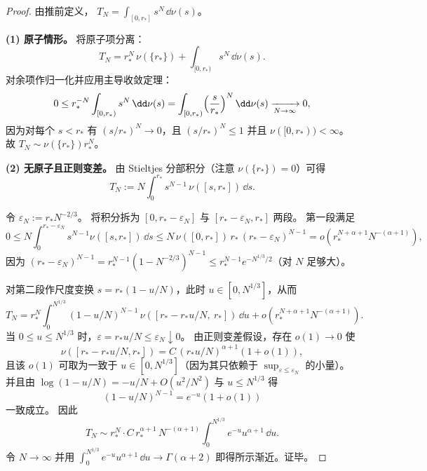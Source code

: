 \begin{proof}
由推前定义，
\(
T_N=\int_{[0,r_\ast]} s^N\,\dd\nu(s)
\)。

\textbf{(1) 原子情形。}
将原子项分离：
\[
T_N=r_\ast^N\,\nu(\{r_\ast\})+\int_{[0,r_\ast)} s^{N}\,\dd\nu(s).
\]
对余项作归一化并应用主导收敛定理：
\[
0\le r_\ast^{-N}\int_{[0,r_\ast)} s^{N}\,\dd\nu(s)
=\int_{[0,r_\ast)}\Bigl(\frac{s}{r_\ast}\Bigr)^{N}\,\dd\nu(s)\xrightarrow[N\to\infty]{}0,
\]
因为对每个 \(s<r_\ast\) 有 \((s/r_\ast)^N\to 0\)，且 \((s/r_\ast)^N\le 1\) 并且 \(\nu([0,r_\ast))<\infty\)。
故 \(T_N\sim \nu(\{r_\ast\})r_\ast^N\)。

\textbf{(2) 无原子且正则变差。}
由 Stieltjes 分部积分（注意 \(\nu(\{r_\ast\})=0\)）可得
\[
T_N
:=N\int_{0}^{r_\ast} s^{N-1}\,\nu([s,r_\ast])\,\dd s.
\]
\par
令 \(\varepsilon_N:=r_\ast N^{-2/3}\)。
将积分拆为 \([0,r_\ast-\varepsilon_N]\) 与 \([r_\ast-\varepsilon_N,r_\ast]\) 两段。
第一段满足
\[
0\le N\int_{0}^{r_\ast-\varepsilon_N} s^{N-1}\nu([s,r_\ast])\,\dd s
\le N\,\nu([0,r_\ast])\,r_\ast\,(r_\ast-\varepsilon_N)^{N-1}
=o\!\left(r_\ast^{N+\alpha+1}N^{-(\alpha+1)}\right),
\]
因为 \((r_\ast-\varepsilon_N)^{N-1}=r_\ast^{N-1}(1-N^{-2/3})^{N-1}\le r_\ast^{N-1}e^{-N^{1/3}/2}\)（对 \(N\) 足够大）。
\par
对第二段作尺度变换 \(s=r_\ast(1-u/N)\)，此时 \(u\in[0,N^{1/3}]\)，从而
\[
T_N
=r_\ast^{N}\int_{0}^{N^{1/3}}(1-u/N)^{N-1}\,
\nu\!\left([r_\ast-r_\ast u/N,\ r_\ast]\right)\,\dd u
+o\!\left(r_\ast^{N+\alpha+1}N^{-(\alpha+1)}\right).
\]
当 \(0\le u\le N^{1/3}\) 时，\(\varepsilon=r_\ast u/N\le \varepsilon_N\downarrow 0\)。
由正则变差假设，存在 \(o(1)\to 0\) 使
\[
\nu([r_\ast-r_\ast u/N,r_\ast])=C\,(r_\ast u/N)^{\alpha+1}(1+o(1)),
\]
且该 \(o(1)\) 可取为一致于 \(u\in[0,N^{1/3}]\)（因为其只依赖于 \(\sup_{\varepsilon\le \varepsilon_N}\) 的小量）。
并且由 \(\log(1-u/N)=-u/N+O(u^2/N^2)\) 与 \(u\le N^{1/3}\) 得
\[
(1-u/N)^{N-1}=e^{-u}(1+o(1))
\]
一致成立。
因此
\[
T_N
\sim r_\ast^{N}\cdot C\,r_\ast^{\alpha+1}\,N^{-(\alpha+1)}
\int_{0}^{N^{1/3}}e^{-u}u^{\alpha+1}\,\dd u.
\]
令 \(N\to\infty\) 并用 \(\int_{0}^{N^{1/3}}e^{-u}u^{\alpha+1}\,\dd u\to \Gamma(\alpha+2)\) 即得所示渐近。证毕。
\end{proof}

